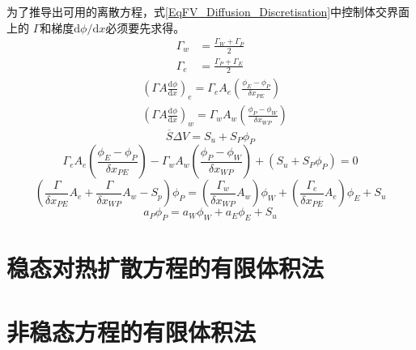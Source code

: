 为了推导出可用的离散方程，式\eqref{EqFV_Diffusion_Discretisation}中控制体交界面上的
$\Gamma$和梯度$\mathrm{d}\phi/\mathrm{d}x$必须要先求得。
\begin{subequations}
  \begin{align}
  \Gamma_{w} 
  &=
  \frac{\Gamma_{W}+\Gamma_{P}}{2}
  \\
  \Gamma_{e} 
  &=
  \frac{\Gamma_{P}+\Gamma_{E}}{2}
  \end{align}
\end{subequations}
\begin{subequations}
  \begin{align}
  &\left(
    \Gamma A\frac{\mathrm{d} \phi}{\mathrm{d} x}
  \right)_{e}
  =
  \Gamma_{e}A_{e}
  \left(
    \frac{\phi_{E}-\phi_{P}}{\delta x_{PE}}
  \right)
    \\
  &\left(
    \Gamma A\frac{\mathrm{d} \phi}{\mathrm{d} x}
  \right)_{w}
  =
  \Gamma_{w}A_{w}
  \left(
    \frac{\phi_{P}-\phi_{W}}{\delta x_{WP}}
  \right)
  \end{align}
\end{subequations}
\begin{equation}
  \overline{S}\Delta V = S_{u} + S_{P}\phi_{P}
\end{equation}
\begin{equation}
  \Gamma_{e}A_{e}
  \left(
    \frac{\phi_{E}-\phi_{P}}{\delta x_{PE}}
  \right)
  -
  \Gamma_{w}A_{w}
  \left(
    \frac{\phi_{P}-\phi_{W}}{\delta x_{WP}}
  \right)
  +
  (S_{u} + S_{P}\phi_{P})
  =
  0
\end{equation}
\begin{equation}
  \left(
    \frac{\Gamma}{\delta x_{PE}}A_{e}
    +
    \frac{\Gamma}{\delta x_{WP}}A_{w}
    -
    S_{p}
  \right)
  \phi_{P}
  =
  \left(
    \frac{\Gamma_{w}}{\delta x_{WP}}A_{w}
  \right)\phi_{W}
  +
  \left(
    \frac{\Gamma_{e}}{\delta x_{PE}}A_{e}
  \right)\phi_{E}
  +
  S_{u}
\end{equation}
\begin{equation}
  a_{P}\phi_{P} = a_{W}\phi_{W} + a_{E}\phi_{E}+S_{u}
\end{equation}


\section{稳态对热扩散方程的有限体积法}

\section{非稳态方程的有限体积法}

